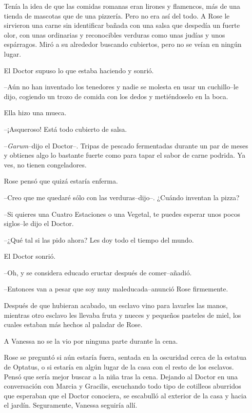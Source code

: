 Tenía la idea de que las comidas romanas eran lirones y flamencos, más
de una tienda de mascotas que de una pizzería. Pero no era así del todo.
A Rose le sirvieron una carne sin identificar bañada con una salsa que
despedía un fuerte olor, con unas ordinarias y reconocibles verduras
como unas judías y unos espárragos. Miró a su alrededor buscando
cubiertos, pero no se veían en ningún lugar.

El Doctor supuso lo que estaba haciendo y sonrió.

--Aún no han inventado los tenedores y nadie se molesta en usar un
cuchillo--le dijo, cogiendo un trozo de comida con los dedos y
metiéndoselo en la boca.

Ella hizo una mueca.

--¡Asqueroso! Está todo cubierto de salsa.

--\emph{Garum}--dijo el Doctor--. Tripas de pescado fermentadas durante
un par de meses y obtienes algo lo bastante fuerte como para tapar el
sabor de carne podrida. Ya ves, no tienen congeladores.

Rose pensó que quizá estaría enferma.

--Creo que me quedaré sólo con las verduras--dijo--. ¿Cuándo inventan la
pizza?

--Si quieres una Cuatro Estaciones o una Vegetal, te puedes esperar unos
pocos siglos--le dijo el Doctor.

--¿Qué tal si las pido ahora? Les doy todo el tiempo del mundo.

El Doctor sonrió.

--Oh, y se considera educado eructar después de comer--añadió.

--Entonces van a pesar que soy muy maleducada--anunció Rose firmemente.

Después de que hubieran acabado, un esclavo vino para lavarles las
manos, mientras otro esclavo les llevaba fruta y nueces y pequeños
pasteles de miel, los cuales estaban más hechos al paladar de Rose.

A Vanessa no se la vio por ninguna parte durante la cena.

Rose se preguntó si aún estaría fuera, sentada en la oscuridad cerca de
la estatua de Optatus, o si estaría en algún lugar de la casa con el
resto de los esclavos. Pensó que sería mejor buscar a la niña tras la
cena. Dejando al Doctor en una conversación con Marcia y Gracilis,
escuchando todo tipo de cotilleos aburridos que esperaban que el Doctor
conociera, se escabulló al exterior de la casa y hacia el jardín.
Seguramente, Vanessa seguiría allí.

